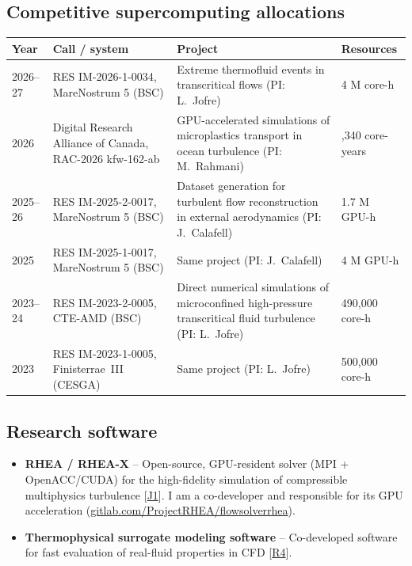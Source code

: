 \documentclass[11pt]{article}
\newcommand{\NEW}[1]{\iffinal #1\else{\color{red}#1}\fi} %
\begin{document}
\subsection{Competitive supercomputing allocations}\label{sec:hpc}
\begin{center}\small
\begin{tabularx}{\textwidth}{@{}p{1.4cm}p{3.3cm}Xp{2.4cm}@{}}
\toprule
\textbf{Year} & \textbf{Call / system} & \textbf{Project} & \textbf{Resources} \\
\midrule
2026--27 & RES IM-2026-1-0034, MareNostrum 5 (BSC) & Extreme thermofluid events in transcritical flows (PI: L.\ Jofre) & 4 M core-h \\
2026 & Digital Research Alliance of Canada, RAC-2026 kfw-162-ab & GPU-accelerated simulations of microplastics transport in ocean turbulence (PI: M.\ Rahmani) & \NEW{1,340} core-years \\
2025--26 & RES IM-2025-2-0017, MareNostrum 5 (BSC) & Dataset generation for turbulent flow reconstruction in external aerodynamics (PI: J.\ Calafell) & 1.7 M GPU-h \\
2025 & RES IM-2025-1-0017, MareNostrum 5 (BSC) & Same project (PI: J.\ Calafell) & 4 M GPU-h \\
2023--24 & RES IM-2023-2-0005, CTE-AMD (BSC) & Direct numerical simulations of microconfined high-pressure transcritical fluid turbulence (PI: L.\ Jofre) & 490,000 core-h \\
2023 & RES IM-2023-1-0005, \NEW{Finisterrae~III} (CESGA) & Same project (PI: L.\ Jofre) & 500,000 core-h \\
\bottomrule
\end{tabularx}
\end{center}

\subsection{Research software}
\begin{itemize}
  \item \textbf{RHEA / RHEA-X} -- Open-source, GPU-resident solver (MPI + OpenACC/CUDA) for
  the high-fidelity simulation of compressible multiphysics turbulence
  [\hyperlink{pub-J1}{J1}]. I am a co-developer and responsible for its GPU acceleration (\href{https://gitlab.com/ProjectRHEA/flowsolverrhea}{gitlab.com/ProjectRHEA/flowsolverrhea}).
  
  \item \textbf{Thermophysical surrogate modeling software} -- Co-developed software for fast evaluation of real-fluid properties in CFD [\hyperlink{pub-R4}{R4}].
\end{itemize}
\end{document}
